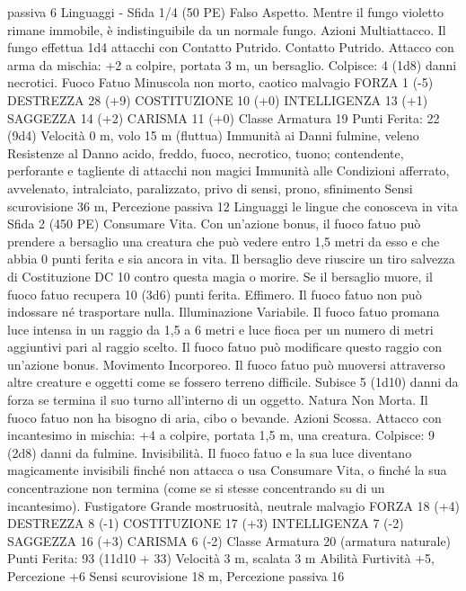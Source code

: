 \begin{multicols}{2}
passiva 6
Linguaggi -
Sfida 1/4 (50 PE)
Falso Aspetto. Mentre il fungo violetto rimane immobile, è
indistinguibile da un normale fungo.
Azioni
Multiattacco. Il fungo effettua 1d4 attacchi con Contatto Putrido.
Contatto Putrido. Attacco con arma da mischia: +2 a colpire,
portata 3 m, un bersaglio.
Colpisce: 4 (1d8) danni necrotici.
Fuoco Fatuo
Minuscola non morto, caotico malvagio
FORZA 1 (-5)
DESTREZZA 28 (+9)
COSTITUZIONE 10 (+0)
INTELLIGENZA 13 (+1)
SAGGEZZA 14 (+2)
CARISMA 11 (+0)
Classe Armatura 19
\hspace*{0pt}\hfill{Punti Ferita}: 22 (9d4)
Velocità 0 m, volo 15 m (fluttua)
Immunità ai Danni fulmine, veleno
Resistenze al Danno acido, freddo, fuoco, necrotico, tuono;
contendente, perforante e tagliente di attacchi non magici
Immunità alle Condizioni afferrato, avvelenato, intralciato,
paralizzato, privo di sensi, prono, sfinimento
Sensi scurovisione 36 m, Percezione passiva 12
Linguaggi le lingue che conosceva in vita
Sfida 2 (450 PE)
Consumare Vita. Con un’azione bonus, il fuoco fatuo può
prendere a bersaglio una creatura che può vedere entro 1,5 metri
da esso e che abbia 0 punti ferita e sia ancora in vita. Il bersaglio
deve riuscire un tiro salvezza di Costituzione DC 10 contro
questa magia o morire. Se il bersaglio muore, il fuoco fatuo
recupera 10 (3d6) punti ferita.
Effimero. Il fuoco fatuo non può indossare né trasportare nulla.
Illuminazione Variabile. Il fuoco fatuo promana luce intensa in
un raggio da 1,5 a 6 metri e luce fioca per un numero di metri
aggiuntivi pari al raggio scelto. Il fuoco fatuo può modificare
questo raggio con un’azione bonus.
Movimento Incorporeo. Il fuoco fatuo può muoversi attraverso
altre creature e oggetti come se fossero terreno difficile. Subisce
5 (1d10) danni da forza se termina il suo turno all’interno di un
oggetto.
Natura Non Morta. Il fuoco fatuo non ha bisogno di aria, cibo o
bevande.
Azioni
Scossa. Attacco con incantesimo in mischia: +4 a colpire, portata
1,5 m, una creatura.
Colpisce: 9 (2d8) danni da fulmine.
Invisibilità. Il fuoco fatuo e la sua luce diventano magicamente
invisibili finché non attacca o usa Consumare Vita, o finché la
sua concentrazione non termina (come se si stesse concentrando
su di un incantesimo).
Fustigatore
Grande mostruosità, neutrale malvagio
FORZA 18 (+4)
DESTREZZA 8 (-1)
COSTITUZIONE 17 (+3)
INTELLIGENZA 7 (-2)
SAGGEZZA 16 (+3)
CARISMA 6 (-2)
Classe Armatura 20 (armatura naturale)
\hspace*{0pt}\hfill{Punti Ferita}: 93 (11d10 + 33)
Velocità 3 m, scalata 3 m
Abilità Furtività +5, Percezione +6
Sensi scurovisione 18 m, Percezione passiva 16

\end{multicols}
